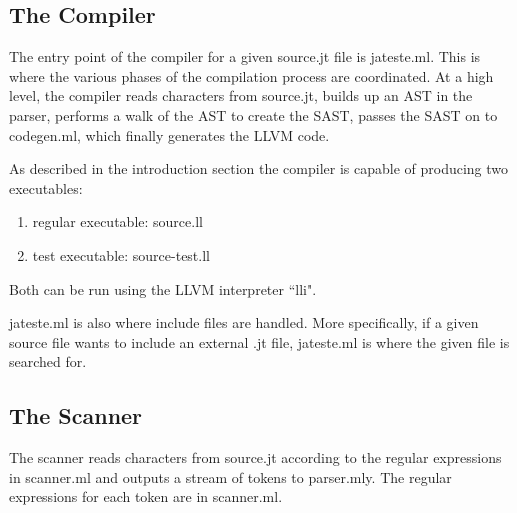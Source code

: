 \documentclass{article}
\begin{document}



\subsection{The Compiler}
The entry point of the compiler for a given source.jt file is jateste.ml. This is where the various phases of the compilation process are coordinated. At a high level, the compiler reads characters from source.jt, builds up an AST in the parser, performs a walk of the AST to create the SAST, passes the SAST on to codegen.ml, which finally generates the LLVM code. 
\par
As described in the introduction section the compiler is capable of producing two executables:
\begin{enumerate}
\item regular executable: source.ll
\item test executable: source-test.ll
\end{enumerate}
Both can be run using the LLVM interpreter ``lli". 
\par
jateste.ml is also where include files are handled. More specifically, if a given source file wants to include an external \*.jt file, jateste.ml is where the given file is searched for.
\subsection{The Scanner}
The scanner reads characters from source.jt according to the regular expressions in scanner.ml and outputs a stream of tokens to parser.mly. The regular expressions for each token are in scanner.ml.
\end{document}
